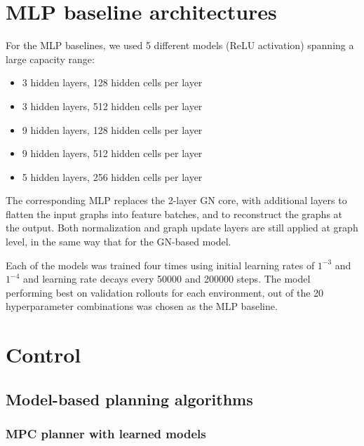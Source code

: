 \section{MLP baseline architectures}
\label{sm:sec:MLP baseline}

For the MLP baselines, we used 5 different models (ReLU activation) spanning a large capacity range:
\begin{itemize}
    \item 3 hidden layers, 128 hidden cells per layer
    \item 3 hidden layers, 512 hidden cells per layer
    \item 9 hidden layers, 128 hidden cells per layer
    \item 9 hidden layers, 512 hidden cells per layer
    \item 5 hidden layers, 256 hidden cells per layer
\end{itemize}

The corresponding MLP replaces the 2-layer GN core, with additional layers to flatten the input graphs into feature batches, and to reconstruct the graphs at the output. Both normalization and graph update layers are still applied at graph level, in the same way that for the GN-based model.

Each of the models was trained four times using initial learning rates of $1^{-3}$ and $1^{-4}$ and learning rate decays every 50000 and 200000 steps. The model performing best on validation rollouts for each environment, out of the 20 hyperparameter combinations was chosen as the MLP baseline.

\section{Control}
\label{sm:sec:control}

\subsection{Model-based planning algorithms}
\label{sm:sec:model_based_planning}

\subsubsection{MPC planner with learned models}
\label{sm:sec:planning_mpc}

